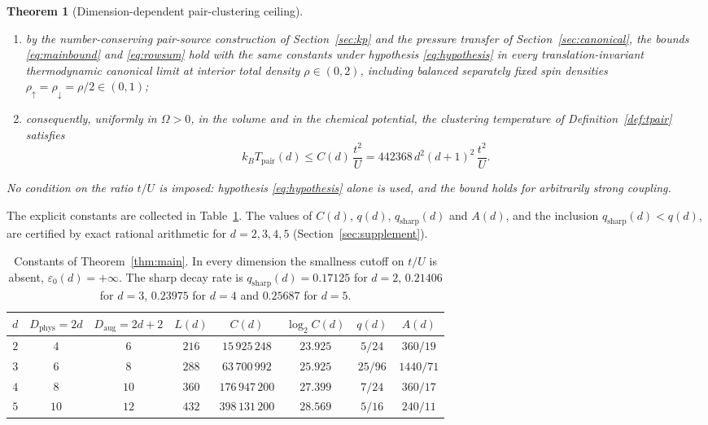 \documentclass[11pt]{article}
\theoremstyle{plain}
\newtheorem{theorem}{Theorem}
\theoremstyle{definition}
\newcommand{\Dphys}{D_{\mathrm{phys}}}
\newcommand{\Daug}{D_{\mathrm{aug}}}
\newcommand{\Dop}{\Delta}
\begin{document}
\begin{theorem}[Dimension-dependent pair-clustering ceiling]
\begin{enumerate}
\begin{equation}\label{eq:rowsum}
 \sup_{M\ge4}\max_{x\in\Lambda}\sum_{y\in\Lambda}
 \bigl|\langle\Dop_x^\dagger\Dop_y\rangle_{\beta,\mu,\Lambda}\bigr|
 \le 1+A(d)\left[\left(\frac{1+q(d)}{1-q(d)}\right)^d-1\right]<\infty;
\end{equation}
\item by the number-conserving pair-source construction of Section~\ref{sec:kp} and
the pressure transfer of Section~\ref{sec:canonical}, the bounds \eqref{eq:mainbound} and \eqref{eq:rowsum}
hold with the same constants under hypothesis \eqref{eq:hypothesis} in every
translation-invariant thermodynamic canonical limit at interior total density
$\rho\in(0,2)$, including balanced separately fixed spin densities
$\rho_\uparrow=\rho_\downarrow=\rho/2\in(0,1)$;
\item consequently, uniformly in $\Omega>0$, in the volume and in the chemical
potential, the clustering temperature of Definition~\ref{def:tpair} satisfies
\begin{equation}\label{eq:tpc}
 k_BT_{\mathrm{pair}}(d)\le C(d)\,\frac{t^2}{U}=442368\,d^2(d+1)^2\,\frac{t^2}{U}.
\end{equation}
\end{enumerate}
No condition on the ratio $t/U$ is imposed: hypothesis \eqref{eq:hypothesis} alone is
used, and the bound holds for arbitrarily strong coupling.
\end{theorem}

The explicit constants are collected in Table~\ref{tab:constants}. The values of
$C(d)$, $q(d)$, $q_{\mathrm{sharp}}(d)$ and $A(d)$, and the inclusion
$q_{\mathrm{sharp}}(d)<q(d)$, are certified by exact rational arithmetic for
$d=2,3,4,5$ (Section~\ref{sec:supplement}).

\begin{table}[t]
\centering
\small
\setlength{\tabcolsep}{5pt}
\begin{tabular}{@{}cccccccc@{}}
\hline
$d$ & $\Dphys=2d$ & $\Daug=2d+2$ & $L(d)$ & $C(d)$ & $\log_2C(d)$ & $q(d)$ & $A(d)$\\
\hline
$2$ & $4$ & $6$  & $216$ & $15\,925\,248$  & $23.925$ & $5/24$ & $360/19$\\
$3$ & $6$ & $8$  & $288$ & $63\,700\,992$  & $25.925$ & $25/96$ & $1440/71$\\
$4$ & $8$ & $10$ & $360$ & $176\,947\,200$ & $27.399$ & $7/24$ & $360/17$\\
$5$ & $10$& $12$ & $432$ & $398\,131\,200$ & $28.569$ & $5/16$ & $240/11$\\
\hline
\end{tabular}
\caption{Constants of Theorem~\ref{thm:main}. In every dimension the smallness
cutoff on $t/U$ is absent, $\varepsilon_0(d)=+\infty$. The sharp decay rate is
$q_{\mathrm{sharp}}(d)=0.17125$ for $d=2$, $0.21406$ for $d=3$, $0.23975$ for $d=4$
and $0.25687$ for $d=5$.}
\label{tab:constants}
\end{table}
\end{document}
